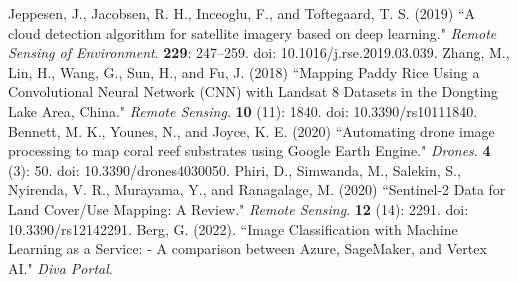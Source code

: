 \documentclass[3p,times,procedia]{elsarticle}
\begin{document}
\begin{thebibliography}{}
Jeppesen, J., Jacobsen, R. H., Inceoglu, F., and Toftegaard, T. S. (2019) ``A cloud detection algorithm for satellite imagery based on deep learning." {\it Remote Sensing of Environment}. {\bf 229}: 247--259. doi: 10.1016/j.rse.2019.03.039.
Zhang, M., Lin, H., Wang, G., Sun, H., and Fu, J. (2018) ``Mapping Paddy Rice Using a Convolutional Neural Network (CNN) with Landsat 8 Datasets in the Dongting Lake Area, China." {\it Remote Sensing}. {\bf 10} (11): 1840. doi: 10.3390/rs10111840.
Bennett, M. K., Younes, N., and Joyce, K. E. (2020) ``Automating drone image processing to map coral reef substrates using Google Earth Engine." {\it Drones}. {\bf 4} (3): 50. doi: 10.3390/drones4030050.
Phiri, D., Simwanda, M., Salekin, S., Nyirenda, V. R., Murayama, Y., and Ranagalage, M. (2020) ``Sentinel-2 Data for Land Cover/Use Mapping: A Review." {\it Remote Sensing}. {\bf 12} (14): 2291. doi: 10.3390/rs12142291.
Berg, G. (2022). ``Image Classification with Machine Learning as a Service: - A comparison between Azure, SageMaker, and Vertex AI." {\it Diva Portal}.

\end{thebibliography}
\end{document}
